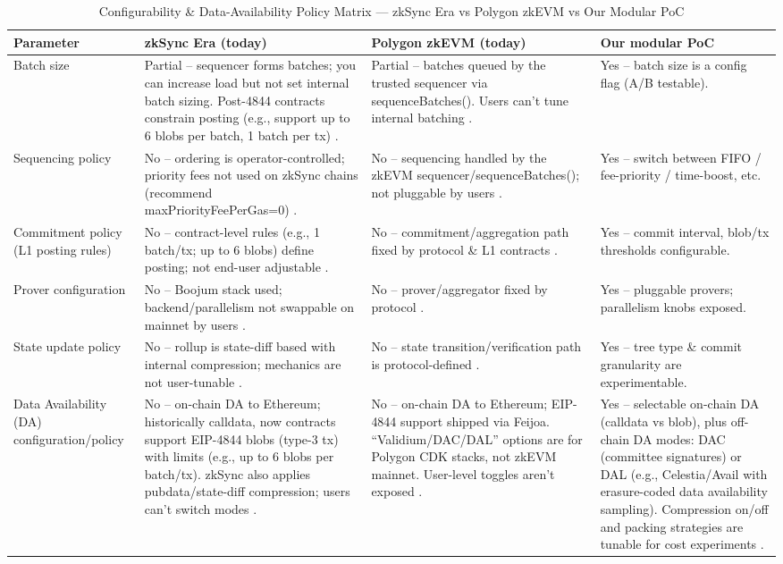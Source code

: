 \begin{table}[htbp]
\centering
\caption{Configurability \& Data-Availability Policy Matrix — zkSync Era vs Polygon zkEVM vs Our Modular PoC}
\label{tab:rollup_comparison}
\begin{tabular}{|l|p{}|p{}|p{}|}
\hline
\textbf{Parameter} & \textbf{zkSync Era (today)} & \textbf{Polygon zkEVM (today)} & \textbf{Our modular PoC} \\
\hline
Batch size & Partial – sequencer forms batches; you can increase load but not set internal batch sizing. Post-4844 contracts constrain posting (e.g., support up to 6 blobs per batch, 1 batch per tx) \cite{zkSyncDocs}. & Partial – batches queued by the trusted sequencer via sequenceBatches(). Users can’t tune internal batching \cite{Polygon}. & Yes – batch size is a config flag (A/B testable). \\
\hline
Sequencing policy & No – ordering is operator-controlled; priority fees not used on zkSync chains (recommend maxPriorityFeePerGas=0) \cite{zkSyncDocs}. & No – sequencing handled by the zkEVM sequencer/sequenceBatches(); not pluggable by users \cite{Polygon}. & Yes – switch between FIFO / fee-priority / time-boost, etc. \\
\hline
Commitment policy (L1 posting rules) & No – contract-level rules (e.g., 1 batch/tx; up to 6 blobs) define posting; not end-user adjustable \cite{zkSyncDocs}. & No – commitment/aggregation path fixed by protocol \& L1 contracts \cite{Polygon}. & Yes – commit interval, blob/tx thresholds configurable. \\
\hline
Prover configuration & No – Boojum stack used; backend/parallelism not swappable on mainnet by users \cite{zkSyncDocs}. & No – prover/aggregator fixed by protocol \cite{Polygon}. & Yes – pluggable provers; parallelism knobs exposed. \\
\hline
State update policy & No – rollup is state-diff based with internal compression; mechanics are not user-tunable \cite{zkSyncDocs}. & No – state transition/verification path is protocol-defined \cite{Polygon}. & Yes – tree type \& commit granularity are experimentable. \\
\hline
Data Availability (DA) configuration/policy & No – on-chain DA to Ethereum; historically calldata, now contracts support EIP-4844 blobs (type-3 tx) with limits (e.g., up to 6 blobs per batch/tx). zkSync also applies pubdata/state-diff compression; users can’t switch modes \cite{zkSyncDocs}. & No – on-chain DA to Ethereum; EIP-4844 support shipped via Feijoa. “Validium/DAC/DAL” options are for Polygon CDK stacks, not zkEVM mainnet. User-level toggles aren’t exposed \cite{Polygon}. & Yes – selectable on-chain DA (calldata vs blob), plus off-chain DA modes: DAC (committee signatures) or DAL (e.g., Celestia/Avail with erasure-coded data availability sampling). Compression on/off and packing strategies are tunable for cost experiments \cite{L2BEAT}. \\
\hline
\end{tabular}
\end{table}